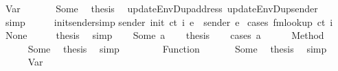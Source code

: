 \begin{isabellebody}
\ {\isacharparenleft}{\kern0pt}Var\ {\isacharunderscore}{\kern0pt}{\isacharparenright}{\kern0pt}\isanewline
\ \ \ \ \isamarkupfalse%
\ Some\ \isamarkupfalse%
\ {\isacharquery}{\kern0pt}thesis\ \isamarkupfalse%
\ updateEnvDup{\isacharunderscore}{\kern0pt}address\ updateEnvDup{\isacharunderscore}{\kern0pt}sender\ \isamarkupfalse%
\ simp\isanewline
\ \ \isamarkupfalse%
\ \isanewline
{}\isamarkupfalse%
%
\endisatagproof
{\isafoldproof}%
%
\isadelimproof
\isanewline
%
\endisadelimproof
\isanewline
{}\isamarkupfalse%
\ init{\isacharunderscore}{\kern0pt}sender{\isacharbrackleft}{\kern0pt}simp{\isacharbrackright}{\kern0pt}{\isacharcolon}{\kern0pt}\isanewline
{\isachardoublequoteopen}sender\ {\isacharparenleft}{\kern0pt}init\ ct\ i\ e{\isacharparenright}{\kern0pt}\ {\isacharequal}{\kern0pt}\ sender\ e{\isachardoublequoteclose}\isanewline
%
\isadelimproof
%
\endisadelimproof
%
\isatagproof
{}\isamarkupfalse%
\ {\isacharparenleft}{\kern0pt}cases\ {\isachardoublequoteopen}fmlookup\ ct\ i{\isachardoublequoteclose}{\isacharparenright}{\kern0pt}\isanewline
\ \ \isamarkupfalse%
\ None\isanewline
\ \ \isamarkupfalse%
\ \isamarkupfalse%
\ {\isacharquery}{\kern0pt}thesis\ \isamarkupfalse%
\ simp\isanewline
{}\isamarkupfalse%
\isanewline
\ \ \isamarkupfalse%
\ {\isacharparenleft}{\kern0pt}Some\ a{\isacharparenright}{\kern0pt}\isanewline
\ \ \isamarkupfalse%
\ {\isacharquery}{\kern0pt}thesis\isanewline
\ \ \isamarkupfalse%
\ {\isacharparenleft}{\kern0pt}cases\ a{\isacharparenright}{\kern0pt}\isanewline
\ \ \ \ \isamarkupfalse%
\ {\isacharparenleft}{\kern0pt}Method\ {\isacharunderscore}{\kern0pt}{\isacharparenright}{\kern0pt}\isanewline
\ \ \ \ \isamarkupfalse%
\ Some\ \isamarkupfalse%
\ {\isacharquery}{\kern0pt}thesis\ \isamarkupfalse%
\ simp\isanewline
\ \ \isamarkupfalse%
\isanewline
\ \ \ \ \isamarkupfalse%
\ {\isacharparenleft}{\kern0pt}Function\ {\isacharunderscore}{\kern0pt}{\isacharparenright}{\kern0pt}\isanewline
\ \ \ \ \isamarkupfalse%
\ Some\ \isamarkupfalse%
\ {\isacharquery}{\kern0pt}thesis\ \isamarkupfalse%
\ simp\isanewline
\ \ \isamarkupfalse%
\isanewline
\ \ \ \ \isamarkupfalse%
\ {\isacharparenleft}{\kern0pt}Var\ {\isacharunderscore}{\kern0pt}{\isacharparenright}{\kern0pt}\isanewline

\end{isabellebody}
